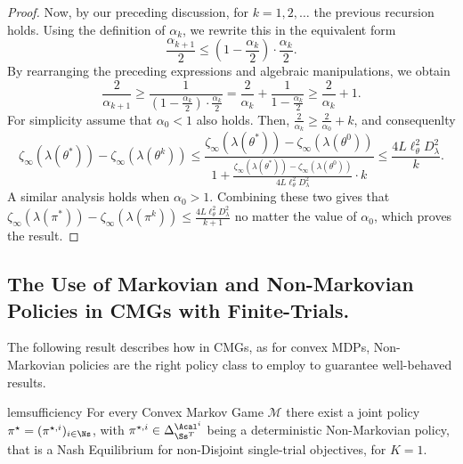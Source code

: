 \begin{proof}
        Now, by our preceding discussion, for $k=1,2,\dots$ the previous recursion holds.
        Using the definition of $\alpha_k$, we rewrite this in the equivalent form  
        \[
        \frac{\alpha_{k+1}}{2}\leq \left(1-\frac{\alpha_{k}}{2}\right)\cdot\frac{\alpha_{k}}{2}.
        \] 
    By rearranging the preceding expressions and algebraic manipulations, we obtain
        $$\frac{2}{\alpha_{k+1}} \geq \frac{1}{\left(1-\frac{\alpha_{k}}{2}\right)\cdot\frac{\alpha_{k}}{2}} = \frac{2}{\alpha_{k}} + \frac{1}{1-\frac{\alpha_{k}}{2}}\geq\frac{2}{\alpha_k} + 1.$$
        For simplicity assume that $\alpha_0<1$ also holds. Then,
        $\frac{2}{\alpha_{k}}\geq \frac{2}{\alpha_0} + k$, and consequenlty
        $$\zeta_\infty(\lambda(\theta^*)) - \zeta_\infty(\lambda(\theta^{k}))\leq \frac{\zeta_\infty(\lambda(\theta^*)) - \zeta_\infty(\lambda(\theta^0))}{1+ \frac{\zeta_\infty(\lambda(\theta^*)) - \zeta_\infty(\lambda(\theta^0))}{4L\ell_{\theta}^2D_\lambda^2}\cdot k} \leq \frac{4L\ell_{\theta}^2D_\lambda^2}{k}.$$
        A similar analysis holds when $\alpha_0>1$. Combining these two gives that 
        $\zeta_\infty(\lambda(\pi^*)) - \zeta_\infty(\lambda(\pi^{k}))\leq \frac{4L\ell_{\theta}^2D_\lambda^2}{k+1}$ no matter the value of $\alpha_0$, which proves the result. 
    \end{proof}

\subsection{The Use of Markovian and Non-Markovian Policies in CMGs with Finite-Trials.}
\label{apx:policies}
The following result describes how in CMGs, as for convex MDPs, Non-Markovian policies are the right policy class to employ to guarantee well-behaved results.

\begin{restatable}{lem}{sufficiency}
    \label{lem:sufficiency} 
    For every Convex Markov Game $\mathcal M$ there exist a joint policy $\pi^\star = (\pi^{\star, i})_{i \in \Ns}$, with $\pi^{\star, i}\in\Delta_{\Ss^T}^{\Acal^i}$ being a deterministic Non-Markovian policy, that is a Nash Equilibrium for non-Disjoint single-trial objectives, for $K=1$.
\end{restatable}

